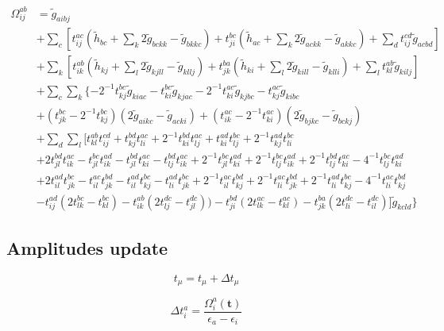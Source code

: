 \begin{equation}
  \begin{split}
    \Omega_{ij}^{ab}&={\tilde g}_{aibj}\\
    &+\sum_{c}[t_{ij}^{ac}({\tilde h}_{bc}+\sum_{k}2{\tilde g}_{bckk}-{\tilde g}_{bkkc})+t_{ji}^{bc}({\tilde h}_{ac}+\sum_{k}2{\tilde g}_{ackk}-{\tilde g}_{akkc})+\sum_dt_{ij}^{cd}{\tilde g}_{acbd}]\\
    &+\sum_{k}[t_{ik}^{ab}({\tilde h}_{kj}+\sum_{l}2{\tilde g}_{kjll}-{\tilde g}_{kllj})+t_{jk}^{ba}({\tilde h}_{ki}+\sum_{l}2{\tilde g}_{kill}-{\tilde g}_{klli})+\sum_lt_{kl}^{ab}{\tilde g}_{kilj}]\\
    &+\sum_{c}\sum_{k}\{-2^{-1}t_{kj}^{bc}{\tilde g}_{kiac}-t_{ki}^{bc}{\tilde g}_{kjac}-2^{-1}t_{ki}^{ac}{\tilde g}_{kjbc}-t_{kj}^{ac}{\tilde g}_{kibc}\\
    &+(t_{jk}^{bc}-2^{-1}t_{kj}^{bc})(2{\tilde g}_{aikc}-{\tilde g}_{acki})+(t_{ik}^{ac}-2^{-1}t_{ki}^{ac})(2{\tilde g}_{bjkc}-{\tilde g}_{bckj})\\
    &+\sum_{d}\sum_{l}[t_{kl}^{ab}t_{ij}^{cd}+t_{kj}^{bd}t_{li}^{ac}+2^{-1}t_{ki}^{bd}t_{lj}^{ac}+t_{ki}^{ad}t_{lj}^{bc}+2^{-1}t_{kj}^{ad}t_{li}^{bc}\\
    &+2t_{jl}^{bd}t_{ik}^{ac}-t_{jl}^{bc}t_{ik}^{ad}-t_{jl}^{bd}t_{ki}^{ac}-t_{lj}^{bd}t_{ik}^{ac}+2^{-1}t_{jl}^{bc}t_{ki}^{ad}+2^{-1}t_{lj}^{bc}t_{ik}^{ad}+2^{-1}t_{lj}^{bd}t_{ki}^{ac}-4^{-1}t_{lj}^{bc}t_{ki}^{ad}\\
    &+2t_{il}^{ad}t_{jk}^{bc}-t_{il}^{ac}t_{jk}^{bd}-t_{il}^{ad}t_{kj}^{bc}-t_{li}^{ad}t_{jk}^{bc}+2^{-1}t_{il}^{ac}t_{kj}^{bd}+2^{-1}t_{li}^{ac}t_{jk}^{bd}+2^{-1}t_{li}^{ad}t_{kj}^{bc}-4^{-1}t_{li}^{ac}t_{kj}^{bd}\\
    &-t_{ij}^{ad}(2t_{lk}^{bc}-t_{kl}^{bc})-t_{ik}^{ab}(2t_{lj}^{dc}-t_{jl}^{dc}))-t_{ji}^{bd}(2t_{lk}^{ac}-t_{kl}^{ac})-t_{jk}^{ba}(2t_{li}^{dc}-t_{il}^{dc})]{\tilde g}_{kcld}\}
  \end{split}
\end{equation}


\subsection{Amplitudes update}
\hypertarget{sec:ccsd_update}{}
\label{sec:ccsd_update}

\begin{equation}
  t_\mu = t_\mu + \Delta t_\mu
\end{equation}

\begin{equation}
  \Delta t_i^a = \frac{\Omega_i^a(\mathbf{t})}{\epsilon_a - \epsilon_i}
\end{equation}

